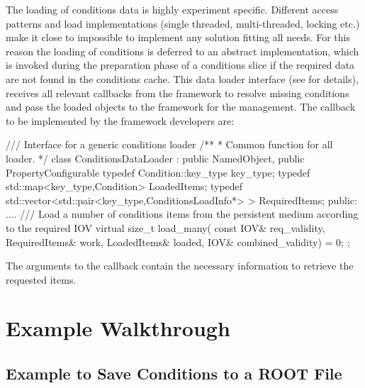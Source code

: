 \documentclass[10pt,a4paper]{article}
\begin{document}
\noindent
The loading of conditions data is highly experiment specific. Different 
access patterns and load implementations (single threaded, multi-threaded, locking etc.)
make it close to impossible to implement any solution fitting all needs.
For this reason the loading of conditions is deferred to an abstract implementation,
which is invoked during the preparation phase of a conditions slice if the required
data are not found in the conditions cache. This data loader interface
(see 
for details), receives all relevant callbacks from the framework to resolve 
missing conditions and pass the loaded objects to the framework for the management.
The callback to be implemented by the framework developers are:
\begin{unnumberedcode}
/// Interface for a generic conditions loader
/** 
 *  Common function for all loader.
 */
class ConditionsDataLoader : public NamedObject, public PropertyConfigurable   {
  typedef Condition::key_type                                   key_type;
  typedef std::map<key_type,Condition>                          LoadedItems;
  typedef std::vector<std::pair<key_type,ConditionsLoadInfo*> > RequiredItems;
public:
  ....
  /// Load a number of conditions items from the persistent medium according to the required IOV
  virtual size_t load_many(  const IOV&       req_validity,
                             RequiredItems&   work,
                             LoadedItems&     loaded,
                             IOV&             combined_validity) = 0;
};
\end{unnumberedcode}
The arguments to the callback contain the necessary information to retrieve
the requested items.

\newpage
\section{Example Walkthrough}
\label{sec:ddcond-example}


\subsection{Example to Save Conditions to a ROOT File}
\label{subsec:ddcond-example-saving}
\end{document}
